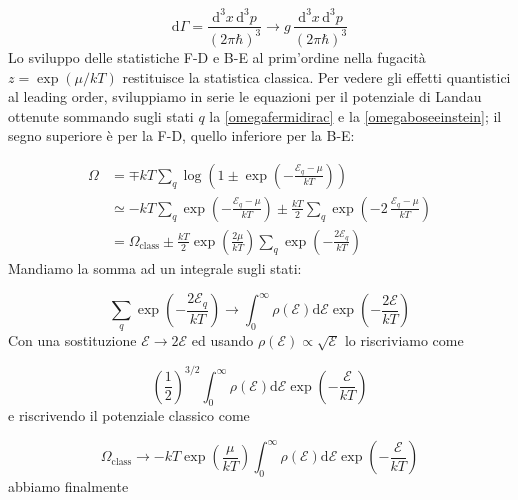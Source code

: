 \documentclass[a4paper]{report}
\begin{document}
\begin{equation}
    \mathrm{d}\Gamma = \frac{\mathrm{d}^3x\,\mathrm{d}^3p}{(2\pi\hbar)^3} \rightarrow g\,\frac{\mathrm{d}^3x\,\mathrm{d}^3p}{(2\pi\hbar)^3} 
\end{equation}
Lo sviluppo delle statistiche F-D e B-E al prim'ordine nella fugacità $z = \exp(\mu/kT)$ restituisce la statistica classica. Per vedere gli effetti quantistici al leading order, sviluppiamo in serie le equazioni per il potenziale di Landau ottenute sommando sugli stati $q$ la \eqref{omegafermidirac} e la \eqref{omegaboseeinstein}; il segno superiore è per la F-D, quello inferiore per la B-E:

\begin{equation}
    \begin{split}
        \Omega & = \mp k T \sum_q \log \left( 1 \pm \exp\left(-\frac{\mathcal{E}_q-\mu}{k T}\right) \right)\\
        & \simeq - k T \sum_q  \exp\left(-\frac{\mathcal{E}_q-\mu}{k T}\right) \pm \frac{k T}{2} \sum_q  \exp\left(-2\,\frac{\mathcal{E}_q-\mu}{k T}\right) \\
        & = \Omega_{\text{class}} \pm \frac{k T}{2} \exp\left(\frac{2\mu}{k T}\right) \sum_q \exp\left(-\frac{2\mathcal{E}_q}{k T}\right)
    \end{split}
\end{equation}
Mandiamo la somma ad un integrale sugli stati:

\begin{equation}
    \sum_q \exp\left(-\frac{2\mathcal{E}_q}{k T}\right) \rightarrow \int_{0}^{\infty} \rho(\mathcal{E})\mathrm{d}\mathcal{E}\exp\left(-\frac{2\mathcal{E}}{k T}\right)
\end{equation}
Con una sostituzione $\mathcal{E} \rightarrow 2\mathcal{E}$ ed usando $\rho(\mathcal{E})\propto \sqrt{\mathcal{E}}$ lo riscriviamo come

\begin{equation}
    \left(\frac{1}{2}\right)^{3/2} \int_{0}^{\infty} \rho(\mathcal{E})\mathrm{d}\mathcal{E}\exp\left(-\frac{\mathcal{E}}{k T}\right)
\end{equation}
e riscrivendo il potenziale classico come

\begin{equation}
    \Omega_{\text{class}} \rightarrow - k T \exp\left(\frac{\mu}{k T}\right) \int_{0}^{\infty} \rho(\mathcal{E})\mathrm{d}\mathcal{E}\exp\left(-\frac{\mathcal{E}}{k T}\right)
\end{equation}
abbiamo finalmente
\end{document}
